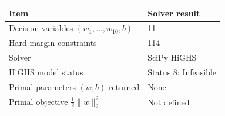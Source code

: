 \begin{tabular}{ll}
\toprule
Item & Solver result \\
\midrule
Decision variables $(w_1,\ldots,w_{10},b)$ & 11 \\
Hard-margin constraints & 114 \\
Solver & SciPy HiGHS \\
HiGHS model status & Status 8: Infeasible \\
Primal parameters $(w,b)$ returned & None \\
Primal objective $\frac12\lVert w\rVert_2^2$ & Not defined \\
\bottomrule
\end{tabular}
